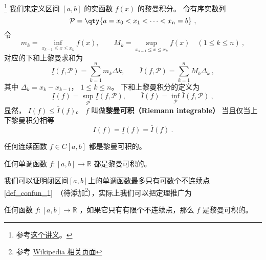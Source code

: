 \footnote{参考\href{https://math.berkeley.edu/~arveson/Dvi/105/note1.pdf}{这个讲义}。}
我们来定义区间 $[a, b]$ 的实函数 $f(x)$ 的黎曼积分。 令有序实数列
\begin{equation}
\mathcal P = \qty{a = x_0 < x_1 < \dots < x_n = b}~,
\end{equation}
令
\begin{equation}
m_k = \inf_{x_{k-1} \le x \le x_k} f(x), \qquad M_k = \sup_{x_{k-1} \le x \le x_k} f(x) \quad (1 \le k \le n)~,
\end{equation}
对应的下和上黎曼求和为
\begin{equation}
\underline I(f, \mathcal P) = \sum_{k = 1}^n m_k\Delta k, \qquad \bar I(f, \mathcal P) = \sum_{k = 1}^n M_k \Delta_k~,
\end{equation}
其中 $\Delta_k = x_k - x_{k-1}$， $1\le k\le n$。 下和上黎曼积分的定义为
\begin{equation}
\underline I(f) = \sup_{\mathcal P} \underline I(f, \mathcal P), \qquad \bar I(f) = \inf_{\mathcal P} \bar I(f, \mathcal P)~,
\end{equation}
显然， $\underline I(f) \le \bar I(f)$。 $f$ 叫做\textbf{黎曼可积（Riemann integrable）} 当且仅当上下黎曼积分相等
\begin{equation}
I(f) = \underline I(f) = \bar I(f)~.
\end{equation}

\begin{theorem}{}
任何连续函数 $f \in C[a, b]$ 都是黎曼可积的。
\end{theorem}

\begin{theorem}{}
任何单调函数 $f: [a, b] \to \mathbb{R}$ 都是黎曼可积的。
\end{theorem}

我们可以证明闭区间$[a, b]$上的单调函数最多只有可数个不连续点\autoref{def_confun_1}~（待添加\footnote{参考 \href{https://en.wikipedia.org/wiki/Discontinuities_of_monotone_functions}{Wikipedia 相关页面}}），实际上我们可以把定理推广为

\begin{theorem}{}
任何函数 $f: [a, b] \to \mathbb{R}$ ，如果它只有有限个不连续点，那么 $f$ 是黎曼可积的。
\end{theorem}


